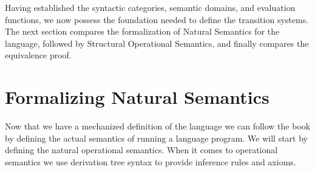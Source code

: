 Having established the syntactic categories, semantic domains, and evaluation functions,
we now possess the foundation needed to define the transition systems.
The next section compares the formalization of Natural Semantics for the \While language,
followed by Structural Operational Semantics, and finally compares the equivalence proof.

%
%
%
\section{Formalizing Natural Semantics}
\label{formal_ns_sos_equiv:sec:ns:formalization}
Now that we have a mechanized definition of the \While language we can follow the book by defining the actual semantics of running a \While language program. 
We will start by defining the natural operational semantics.
When it comes to operational semantics we use derivation tree syntax to provide inference rules and axioms.

